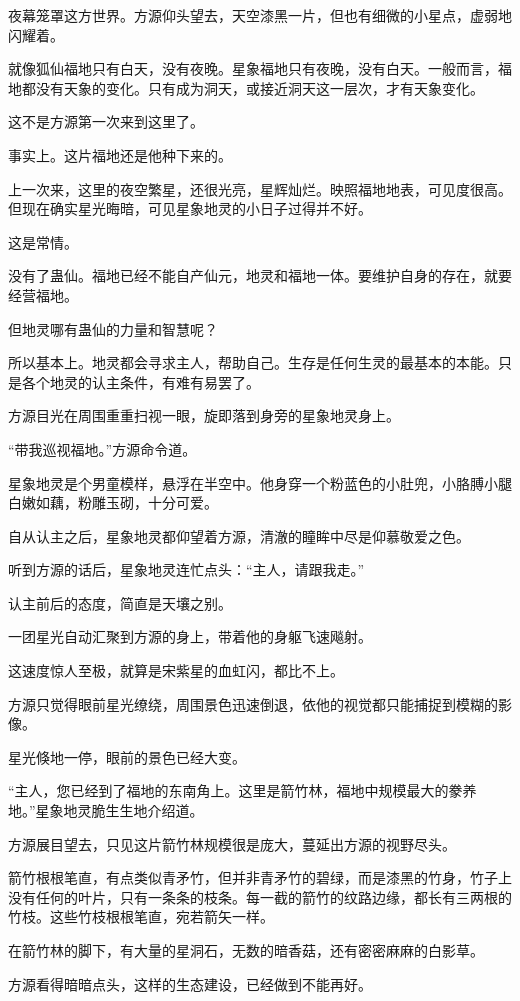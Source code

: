 \begin{this_body}
夜幕笼罩这方世界。方源仰头望去，天空漆黑一片，但也有细微的小星点，虚弱地闪耀着。

就像狐仙福地只有白天，没有夜晚。星象福地只有夜晚，没有白天。一般而言，福地都没有天象的变化。只有成为洞天，或接近洞天这一层次，才有天象变化。

这不是方源第一次来到这里了。

事实上。这片福地还是他种下来的。

上一次来，这里的夜空繁星，还很光亮，星辉灿烂。映照福地地表，可见度很高。但现在确实星光晦暗，可见星象地灵的小日子过得并不好。

这是常情。

没有了蛊仙。福地已经不能自产仙元，地灵和福地一体。要维护自身的存在，就要经营福地。

但地灵哪有蛊仙的力量和智慧呢？

所以基本上。地灵都会寻求主人，帮助自己。生存是任何生灵的最基本的本能。只是各个地灵的认主条件，有难有易罢了。

方源目光在周围重重扫视一眼，旋即落到身旁的星象地灵身上。

“带我巡视福地。”方源命令道。

星象地灵是个男童模样，悬浮在半空中。他身穿一个粉蓝色的小肚兜，小胳膊小腿白嫩如藕，粉雕玉砌，十分可爱。

自从认主之后，星象地灵都仰望着方源，清澈的瞳眸中尽是仰慕敬爱之色。

听到方源的话后，星象地灵连忙点头：“主人，请跟我走。”

认主前后的态度，简直是天壤之别。

一团星光自动汇聚到方源的身上，带着他的身躯飞速飚射。

这速度惊人至极，就算是宋紫星的血虹闪，都比不上。

方源只觉得眼前星光缭绕，周围景色迅速倒退，依他的视觉都只能捕捉到模糊的影像。

星光倏地一停，眼前的景色已经大变。

“主人，您已经到了福地的东南角上。这里是箭竹林，福地中规模最大的豢养地。”星象地灵脆生生地介绍道。

方源展目望去，只见这片箭竹林规模很是庞大，蔓延出方源的视野尽头。

箭竹根根笔直，有点类似青矛竹，但并非青矛竹的碧绿，而是漆黑的竹身，竹子上没有任何的叶片，只有一条条的枝条。每一截的箭竹的纹路边缘，都长有三两根的竹枝。这些竹枝根根笔直，宛若箭矢一样。

在箭竹林的脚下，有大量的星洞石，无数的暗香菇，还有密密麻麻的白影草。

方源看得暗暗点头，这样的生态建设，已经做到不能再好。


\end{this_body}

